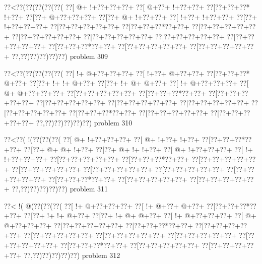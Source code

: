 \vbox{\vbox{\goo
\0??<\0??(\0??(\0??(\0??(\0??(
\0??[\- @+\- !+\0??+\0??+\0??+
\0??[\- @+\0??+\- !+\0??+\0??+
\0??[\0??+\0??+\0??*\- !+\0??+
\0??[\0??+\- @+\0??+\0??+\0??+
\0??[\0??+\- @+\- !+\0??+\0??+
\0??[\- !+\0??+\- !+\0??+\0??+
\0??[\0??+\- !+\0??+\0??+\0??+
\0??[\0??+\0??+\0??+\0??+\0??+
\0??[\0??+\0??+\0??*\0??+\0??+
\0??[\0??+\0??+\0??+\0??+\0??+
\0??[\0??+\0??+\0??+\0??+\0??+
\0??[\0??+\0??+\0??+\0??+\0??+
\0??[\0??+\0??+\0??+\0??+\0??+
\0??[\0??+\0??+\0??+\0??+\0??+
\0??[\0??+\0??+\0??*\0??+\0??+
\0??[\0??+\0??+\0??+\0??+\0??+
\0??[\0??+\0??+\0??+\0??+\0??+
\0??,\0??)\0??)\0??)\0??)\0??)
}
\hfil problem 309\hfil\break
}

\vbox{\vbox{\goo
\0??<\0??(\0??(\0??(\0??(\0??(
\0??[\- !+\- @+\0??+\0??+\0??+
\0??[\- !+\0??+\- @+\0??+\0??+
\0??[\0??+\0??+\0??*\- @+\0??+
\0??[\0??+\- !+\- !+\- @+\0??+
\0??[\0??+\- !+\- @+\- @+\0??+
\0??[\- !+\- @+\0??+\0??+\0??+
\0??[\- @+\- @+\0??+\0??+\0??+
\0??[\0??+\0??+\0??+\0??+\0??+
\0??[\0??+\0??+\0??*\0??+\0??+
\0??[\0??+\0??+\0??+\0??+\0??+
\0??[\0??+\0??+\0??+\0??+\0??+
\0??[\0??+\0??+\0??+\0??+\0??+
\0??[\0??+\0??+\0??+\0??+\0??+
\0??[\0??+\0??+\0??+\0??+\0??+
\0??[\0??+\0??+\0??*\0??+\0??+
\0??[\0??+\0??+\0??+\0??+\0??+
\0??[\0??+\0??+\0??+\0??+\0??+
\0??,\0??)\0??)\0??)\0??)\0??)
}
\hfil problem 310\hfil\break
}

\vbox{\vbox{\goo
\0??<\0??(\- !(\0??(\0??(\0??(
\0??[\- @+\- !+\0??+\0??+\0??+
\0??[\- @+\- !+\0??+\- !+\0??+
\0??[\0??+\0??+\0??*\0??+\0??+
\0??[\0??+\- @+\- @+\- !+\0??+
\0??[\0??+\- @+\- !+\- !+\0??+
\0??[\- @+\- !+\0??+\0??+\0??+
\0??[\- !+\- !+\0??+\0??+\0??+
\0??[\0??+\0??+\0??+\0??+\0??+
\0??[\0??+\0??+\0??*\0??+\0??+
\0??[\0??+\0??+\0??+\0??+\0??+
\0??[\0??+\0??+\0??+\0??+\0??+
\0??[\0??+\0??+\0??+\0??+\0??+
\0??[\0??+\0??+\0??+\0??+\0??+
\0??[\0??+\0??+\0??+\0??+\0??+
\0??[\0??+\0??+\0??*\0??+\0??+
\0??[\0??+\0??+\0??+\0??+\0??+
\0??[\0??+\0??+\0??+\0??+\0??+
\0??,\0??)\0??)\0??)\0??)\0??)
}
\hfil problem 311\hfil\break
}

\vbox{\vbox{\goo
\0??<\- !(\- @(\0??(\0??(\0??(
\0??[\- !+\- @+\0??+\0??+\0??+
\0??[\- !+\- @+\0??+\- @+\0??+
\0??[\0??+\0??+\0??*\0??+\0??+
\0??[\0??+\- !+\- !+\- @+\0??+
\0??[\0??+\- !+\- @+\- @+\0??+
\0??[\- !+\- @+\0??+\0??+\0??+
\0??[\- @+\- @+\0??+\0??+\0??+
\0??[\0??+\0??+\0??+\0??+\0??+
\0??[\0??+\0??+\0??*\0??+\0??+
\0??[\0??+\0??+\0??+\0??+\0??+
\0??[\0??+\0??+\0??+\0??+\0??+
\0??[\0??+\0??+\0??+\0??+\0??+
\0??[\0??+\0??+\0??+\0??+\0??+
\0??[\0??+\0??+\0??+\0??+\0??+
\0??[\0??+\0??+\0??*\0??+\0??+
\0??[\0??+\0??+\0??+\0??+\0??+
\0??[\0??+\0??+\0??+\0??+\0??+
\0??,\0??)\0??)\0??)\0??)\0??)
}
\hfil problem 312\hfil\break
}

